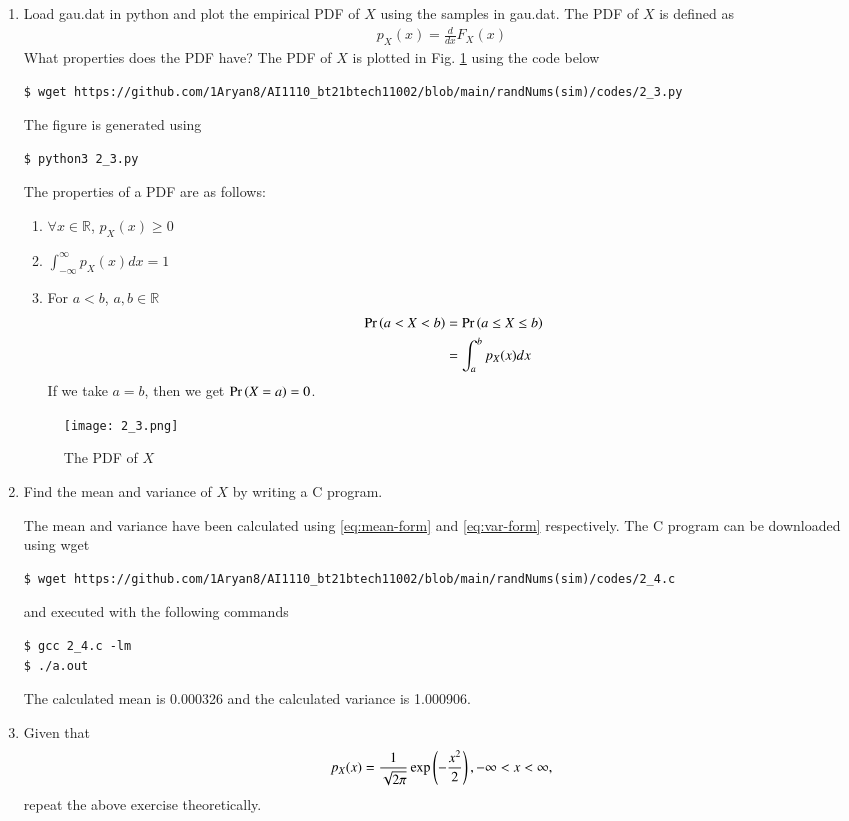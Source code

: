 \documentclass[journal,12pt,twocolumn]{IEEEtran}
\renewcommand\thesection{\arabic{section}}
\begin{document}
\begin{enumerate}[label=\thesection.\arabic*
,ref=\thesection.\theenumi]
\item
Load gau.dat in python and plot the empirical PDF of $X$ using the samples in gau.dat. The PDF of $X$ is defined as
\begin{align}
p_{X}(x) = \frac{d}{dx}F_{X}(x)
	\label{eq:pdf-cdf}
\end{align}
What properties does the PDF have?
\solution The PDF of $X$ is plotted in Fig. \ref{fig:gauss_pdf} using the code below
\begin{lstlisting}
$ wget https://github.com/1Aryan8/AI1110_bt21btech11002/blob/main/randNums(sim)/codes/2_3.py
\end{lstlisting}
The figure is generated using
\begin{lstlisting}
$ python3 2_3.py
\end{lstlisting}
The properties of a PDF are as follows:
		\begin{enumerate}
			\item $\forall x \in \mathbb{R}$, $p_X(x) \geq 0$
			\item $\int_{-\infty}^{\infty}p_X(x)dx = 1$
			\item For $a < b$, $a, b \in \mathbb{R}$ 
				\begin{align}
					\Pr\left(a < X < b\right) &= \Pr\left(a \leq X \leq b\right) \\
					&= \int_{a}^{b}p_X(x)dx
				\end{align}
				If we take $a = b$, then we get $\Pr\left(X = a\right) = 0$.
		\end{enumerate}
\begin{figure}
\centering
\texttt{[image: 2\_3.png]}
\caption{The PDF of $X$}
\label{fig:gauss_pdf}
\end{figure}

\item Find the mean and variance of $X$ by writing a C program.

\solution
The mean and variance have been calculated using \eqref{eq:mean-form} and \eqref{eq:var-form} respectively.
\noindent The C program can be downloaded using wget
\begin{lstlisting}
$ wget https://github.com/1Aryan8/AI1110_bt21btech11002/blob/main/randNums(sim)/codes/2_4.c
\end{lstlisting}
and executed with the following commands
\begin{lstlisting}
$ gcc 2_4.c -lm 
$ ./a.out
\end{lstlisting}
The calculated mean is 0.000326 and the calculated variance is 1.000906.

\item Given that 
\begin{align}
p_{X}(x) = \frac{1}{\sqrt{2\pi}}\exp\left(-\frac{x^2}{2}\right), -\infty < x < \infty,
\end{align}
repeat the above exercise theoretically.


\end{enumerate}
\end{document}
